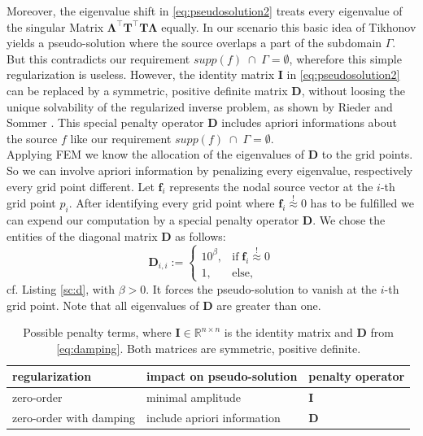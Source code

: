 \documentclass[a4paper, 11pt, twoside]{article}
\begin{document}
Moreover, the eigenvalue shift in \eqref{eq:pseudosolution2} treats every eigenvalue of the singular Matrix $\boldsymbol{\Lambda}^\top\boldsymbol{T}^\top\boldsymbol{T\Lambda}$ equally. In our scenario this basic idea of Tikhonov yields a pseudo-solution where the source overlaps a part of the subdomain $\Gamma$. But this contradicts our requirement $supp(f)\;\cap\;\Gamma=\emptyset$, wherefore this simple regularization is useless. However, the identity matrix $\boldsymbol{I}$ in \eqref{eq:pseudosolution2} can be replaced by a symmetric, positive definite matrix $\boldsymbol{D}$, without loosing the unique solvability of the regularized inverse problem, as shown by Rieder \cite{bib:rie03} and Sommer \cite{bib:som12}. This special penalty operator $\boldsymbol{D}$ includes apriori informations about the source $f$ like our requirement $supp(f)\;\cap\;\Gamma=\emptyset$.\\

Applying FEM we know the allocation of the eigenvalues of $\boldsymbol{D}$ to the grid points. So we can involve apriori information by penalizing every eigenvalue, respectively every grid point different. Let $\boldsymbol{f}_i$ represents the nodal source vector at the $i$-th grid point $p_i$. After identifying every grid point where $\boldsymbol{f}_i\overset{!}{\approx}0$ has to be fulfilled we can expend our computation by a special penalty operator $\boldsymbol{D}$. We chose the entities of the diagonal matrix $\boldsymbol{D}$ as follows:
%
\begin{equation}\label{eq:damping}
	\boldsymbol{D}_{i,i}:=\left\{\begin{array}{ll}
	10^{\beta}, & \text{if}\;\boldsymbol{f}_i\overset{!}{\approx}0\\
	1, & \text{else},
	\end{array}\right.
\end{equation}
%
cf. Listing \ref{sc:d}, with $\beta>0$. It forces the pseudo-solution to vanish at the $i$-th grid point. Note that all eigenvalues of $\boldsymbol{D}$ are greater than one.

\begin{table}[h]
  \centering
  \begin{tabular}{|l|l|l|} \hline
    {\bf regularization} & {\bf impact on pseudo-solution} & {\bf penalty operator} \\ \hline \hline
    zero-order & minimal amplitude & $\boldsymbol{I}$ \\
    zero-order with damping & include apriori information & $\boldsymbol{D}$\\ 
    \hline
  \end{tabular}
  \vspace{5mm} 
  \caption{Possible penalty terms, where $\boldsymbol{I}\in\mathbb{R}^{n\times n}$ is the identity matrix and $\boldsymbol{D}$ from \eqref{eq:damping}. Both matrices are symmetric, positive definite.}
  \label{tab:lmatrix}
\end{table}
\end{document}
